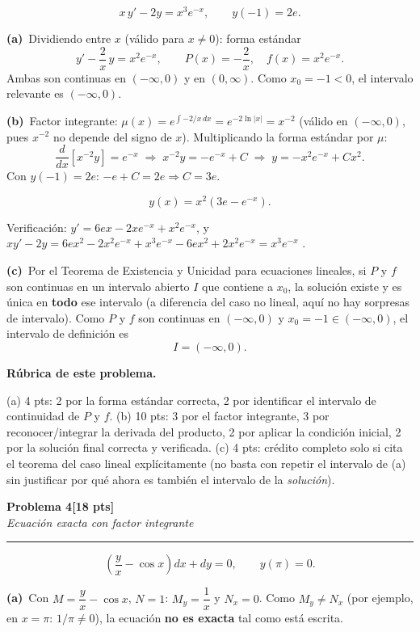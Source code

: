 \documentclass[11pt,letterpaper]{article}
\newcommand{\problema}[3]{%
  \bigskip\bigskip\noindent
  {\Large\textbf{Problema #1}}\hfill\textbf{[#2 pts]}\\[3pt]
  {\small\itshape #3}\par
  \vspace{2pt}\hrule\vspace{8pt}
}
\newcommand{\subparte}[2]{%
  \medskip\noindent\textbf{(#1}\ #2\par\smallskip
}
\newenvironment{resultado}
  {\begin{mdframed}[linecolor=black,linewidth=0.6pt,
    innerleftmargin=6pt,innerrightmargin=6pt,innertopmargin=4pt,innerbottommargin=4pt]
   \bfseries}
  {\end{mdframed}}
\newenvironment{rubrica}{%
  \begin{mdframed}[linecolor=black,linewidth=0.6pt,
    innerleftmargin=8pt,innerrightmargin=8pt,innertopmargin=5pt,innerbottommargin=5pt]
  \small\textbf{Rúbrica de este problema.}\par\smallskip
}{\end{mdframed}}
\begin{document}
\[
x\,y' - 2y = x^3 e^{-x}, \qquad y(-1) = 2e.
\]

\subparte{a)}{Dividiendo entre $x$ (válido para $x\neq0$): forma estándar
\[
y' - \frac{2}{x}\,y = x^2 e^{-x}, \qquad P(x) = -\frac{2}{x}, \quad f(x)=x^2e^{-x}.
\]
Ambas son continuas en $(-\infty,0)$ y en $(0,\infty)$. Como $x_0=-1<0$, el intervalo relevante es $(-\infty,0)$.}

\subparte{b)}{Factor integrante: $\mu(x) = e^{\int -2/x\,dx} = e^{-2\ln|x|} = x^{-2}$ (válido en $(-\infty,0)$, pues $x^{-2}$ no depende del signo de $x$).
Multiplicando la forma estándar por $\mu$:
\[
\frac{d}{dx}\left[x^{-2}y\right] = e^{-x} \;\Longrightarrow\; x^{-2}y = -e^{-x} + C \;\Longrightarrow\; y = -x^2e^{-x} + Cx^2.
\]
Con $y(-1)=2e$: $-e + C = 2e \Rightarrow C = 3e$.
\begin{resultado}
\[
y(x) = x^2\!\left(3e-e^{-x}\right).
\]
\end{resultado}
Verificación: $y' = 6ex - 2xe^{-x}+x^2e^{-x}$, y $xy'-2y = 6ex^2-2x^2e^{-x}+x^3e^{-x}-6ex^2+2x^2e^{-x} = x^3e^{-x}$ \checkmark.}

\subparte{c)}{Por el Teorema de Existencia y Unicidad para ecuaciones lineales, si $P$ y $f$ son continuas en un intervalo abierto $I$ que contiene a $x_0$, la solución existe y es única en \textbf{todo} ese intervalo (a diferencia del caso no lineal, aquí no hay sorpresas de intervalo). Como $P$ y $f$ son continuas en $(-\infty,0)$ y $x_0=-1 \in (-\infty,0)$, el intervalo de definición es
\[
I = (-\infty,0).
\]}

\begin{rubrica}
(a) 4 pts: 2 por la forma estándar correcta, 2 por identificar el intervalo de continuidad de $P$ y $f$. (b) 10 pts: 3 por el factor integrante, 3 por reconocer/integrar la derivada del producto, 2 por aplicar la condición inicial, 2 por la solución final correcta y verificada. (c) 4 pts: crédito completo solo si cita el teorema del caso lineal explícitamente (no basta con repetir el intervalo de (a) sin justificar por qué ahora es también el intervalo de la \emph{solución}).
\end{rubrica}

\newpage
\problema{4}{18}{Ecuación exacta con factor integrante}

\[
\left(\frac{y}{x}-\cos x\right) dx + dy = 0, \qquad y(\pi)=0.
\]

\subparte{a)}{Con $M=\dfrac{y}{x}-\cos x$, $N=1$: $M_y = \dfrac{1}{x}$ y $N_x = 0$. Como $M_y \neq N_x$ (por ejemplo, en $x=\pi$: $1/\pi \neq 0$), la ecuación \textbf{no es exacta} tal como está escrita.}
\end{document}
